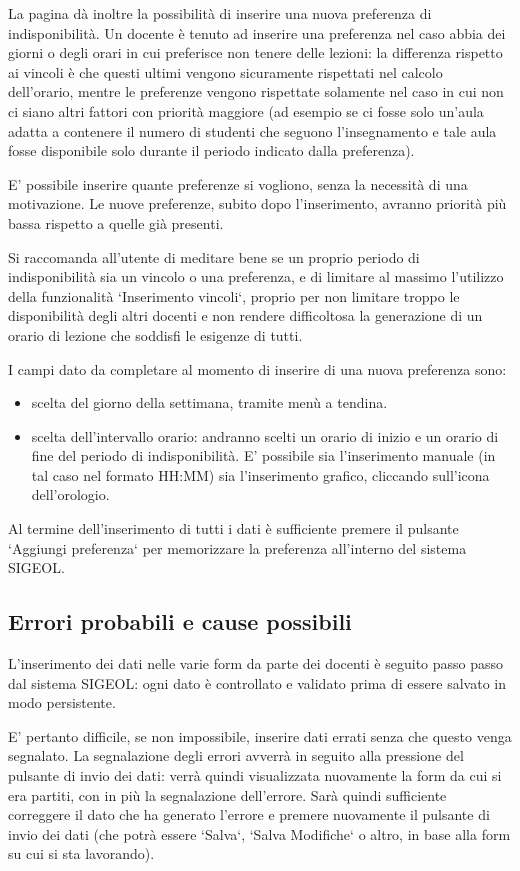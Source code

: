 \documentclass[11pt,a4paper]{article}
\begin{document}
La pagina dà inoltre la possibilità di inserire una nuova preferenza di indisponibilità.
Un docente è tenuto ad inserire una preferenza nel caso abbia dei giorni o degli orari in cui preferisce non tenere delle lezioni: la differenza rispetto ai vincoli è che questi ultimi vengono sicuramente rispettati nel calcolo dell'orario, mentre le preferenze vengono rispettate solamente nel caso in cui non ci siano altri fattori con priorità maggiore (ad esempio se ci fosse solo un'aula adatta a contenere il numero di studenti che seguono l'insegnamento e tale aula fosse disponibile solo durante il periodo indicato dalla preferenza).

E' possibile inserire quante preferenze si vogliono, senza la necessità di una motivazione.
Le nuove preferenze, subito dopo l'inserimento, avranno priorità più bassa rispetto a quelle già presenti.

Si raccomanda all'utente di meditare bene se un proprio periodo di indisponibilità sia un vincolo o una preferenza, e di limitare al massimo l'utilizzo della funzionalità `Inserimento vincoli`, proprio per non limitare troppo le disponibilità degli altri docenti e non rendere difficoltosa la generazione di un orario di lezione che soddisfi le esigenze di tutti.


I campi dato da completare al momento di inserire di una nuova preferenza sono:
\begin{itemize}
 \item scelta del giorno della settimana, tramite menù a tendina.
 \item scelta dell'intervallo orario: andranno scelti un orario di inizio e un orario di fine del periodo di indisponibilità. E' possibile sia l'inserimento manuale (in tal caso nel formato HH:MM) sia l'inserimento grafico, cliccando sull'icona dell'orologio.
\end{itemize}
Al termine dell'inserimento di tutti i dati è sufficiente premere il pulsante `Aggiungi preferenza` per memorizzare la preferenza all'interno del sistema SIGEOL.

\subsection{Errori probabili e cause possibili}
L'inserimento dei dati nelle varie form da parte dei docenti è seguito passo passo dal sistema SIGEOL: ogni dato è controllato e validato prima di essere salvato in modo persistente.

E' pertanto difficile, se non impossibile, inserire dati errati senza che questo venga segnalato.
La segnalazione degli errori avverrà in seguito alla pressione del pulsante di invio dei dati: verrà quindi visualizzata nuovamente la form da cui si era partiti, con in più la segnalazione dell'errore. Sarà quindi sufficiente correggere il dato che ha generato l'errore e premere nuovamente il pulsante di invio dei dati (che potrà essere `Salva`, `Salva Modifiche` o altro, in base alla form su cui si sta lavorando).
\end{document}

